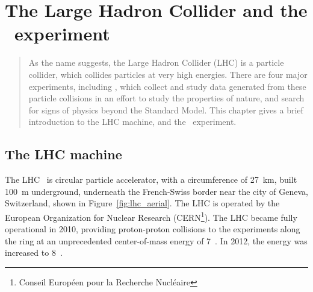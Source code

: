 \chapter[The LHC and the \atlas\ experiment][The LHC and \atlas]
        {The Large Hadron Collider and the \atlas\ experiment}
\label{ch:lhc}

\begin{quote}
  As the name suggests, the Large Hadron Collider (LHC) is a particle collider,
  which collides particles at very high energies.
  There are four major experiments, including \atlas, which collect and study
  data generated from these particle collisions in an effort to study
  the properties of nature, and search for signs of physics beyond the Standard
  Model.
  This chapter gives a brief introduction to the LHC machine, and the
  \atlas\ experiment.
\end{quote}

\FloatBarrier
\section{The LHC machine}
\label{sec:lhc}

The LHC~\cite{cern-jinst-lhc} is circular particle accelerator, with a
circumference of 27~km, built 100~m underground, underneath the French-Swiss
border near the city of Geneva, Switzerland, shown in
Figure~\ref{fig:lhc_aerial}.
The LHC is operated by the European Organization for Nuclear Research
(CERN\footnote{Conseil Europ\'een pour la Recherche Nucl\'eaire}).
The LHC became fully operational in 2010, providing proton-proton collisions
to the experiments along the ring at an unprecedented center-of-mass energy
of 7~\TeV.
In 2012, the energy was increased to 8~\TeV.

